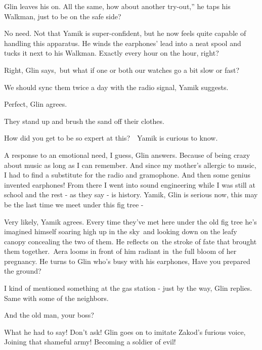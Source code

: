\documentclass[twoside,11pt]{book}
\begin{document}
Glin leaves his on. {\textquotedbl}All the same, how about another try-out,'' he taps his Walkman, {\textquotedbl}just
to be on the safe side?{\textquotedbl} 

{\textquotedbl}No need.{\textquotedbl} Not that Yamik is super-confident, but he now feels quite capable of handling
this apparatus. He winds the earphones' lead into a neat spool and tucks it next to his Walkman. {\textquotedbl}Exactly
every hour on the hour, right?{\textquotedbl} 

{\textquotedbl}Right,{\textquotedbl} Glin says,\ {\textquotedbl}but what if one or both our watches go a bit slow or
fast?{\textquotedbl} 

{\textquotedbl}We should sync them twice a day with the radio signal,{\textquotedbl} Yamik suggests. 

{\textquotedbl}Perfect,{\textquotedbl} Glin agrees.

They stand up and brush the sand off their clothes. 

{\textquotedbl}How did you get to be so expert at this?{\textquotedbl}\ \ Yamik is curious to know.

{\textquotedbl}A response to an emotional need, I guess,{\textquotedbl} Glin answers. {\textquotedbl}Because of being
crazy about music as long as I can remember. And since my mother's allergic to music, I had to find a substitute for
the radio and gramophone. And then some genius invented earphones! From there I went into sound engineering while I was
still at school and the rest - as they say - is history. Yamik,{\textquotedbl} Glin is serious now, {\textquotedbl}this
may be the last time we meet under this fig tree -{\textquotedbl}

{\textquotedbl}Very likely,{\textquotedbl} Yamik agrees. Every time they've met here under the old fig tree he's
imagined himself soaring high up in the sky~and looking down on the leafy canopy concealing the two of them. He
reflects on~the stroke of fate that brought them together.\  Aera looms in front of him radiant in~the full bloom of
her pregnancy. He turns to Glin who's busy with his earphones, {\textquotedbl}Have you prepared the
ground?{\textquotedbl}

{\textquotedbl}I kind of mentioned something at the gas station - just by the way,{\textquotedbl} Glin replies.
{\textquotedbl}Same with some of the neighbors.{\textquotedbl} 

{\textquotedbl}And the old man, your boss?{\textquotedbl} 

{\textquotedbl}What he had to say! Don't ask!{\textquotedbl} Glin goes on to imitate Zakod's furious voice,
{\textquotedbl}Joining that shameful army! Becoming a soldier of evil!{\textquotedbl} 
\end{document}
